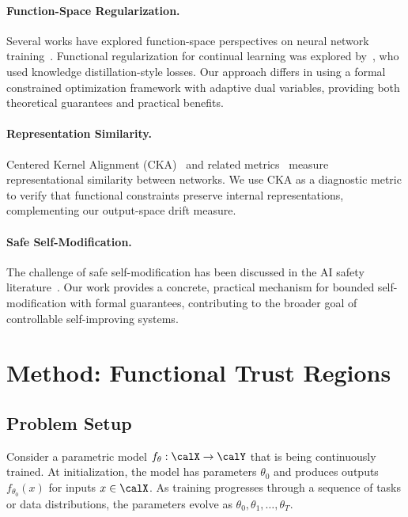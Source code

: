 \documentclass{article}
\begin{document}
\paragraph{Function-Space Regularization.}
Several works have explored function-space perspectives on neural network training~\citep{benjamin2019measuring,titsias2020functional}. Functional regularization for continual learning was explored by~\citet{pan2020continual}, who used knowledge distillation-style losses. Our approach differs in using a formal constrained optimization framework with adaptive dual variables, providing both theoretical guarantees and practical benefits.

\paragraph{Representation Similarity.}
Centered Kernel Alignment (CKA)~\citep{kornblith2019similarity} and related metrics~\citep{raghu2017svcca,morcos2018insights} measure representational similarity between networks. We use CKA as a diagnostic metric to verify that functional constraints preserve internal representations, complementing our output-space drift measure.

\paragraph{Safe Self-Modification.}
The challenge of safe self-modification has been discussed in the AI safety literature~\citep{omohundro2008basic,soares2015corrigibility}. Our work provides a concrete, practical mechanism for bounded self-modification with formal guarantees, contributing to the broader goal of controllable self-improving systems.


\section{Method: Functional Trust Regions}

\subsection{Problem Setup}

Consider a parametric model $f_\theta: \calX \to \calY$ that is being continuously trained. At initialization, the model has parameters $\theta_0$ and produces outputs $f_{\theta_0}(x)$ for inputs $x \in \calX$. As training progresses through a sequence of tasks or data distributions, the parameters evolve as $\theta_0, \theta_1, \ldots, \theta_T$.
\end{document}
